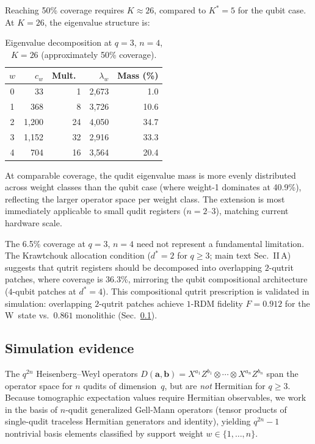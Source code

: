 \documentclass[twocolumn,prx,aps,superscriptaddress,longbibliography]{revtex4-2}
\begin{document}
Reaching 50\% coverage requires $K \approx 26$, compared to
$K^* = 5$ for the qubit case.  At $K = 26$, the eigenvalue
structure is:

\begin{table}[ht!]
\caption{Eigenvalue decomposition at $q = 3$, $n = 4$, $K = 26$
(approximately 50\% coverage).}
\label{tab:q3-k26}
\begin{ruledtabular}
\begin{tabular}{crrrr}
$w$ & $c_w$ & Mult.\ & $\lambda_w$ & Mass (\%) \\
\hline
0 & 33  & 1  & 2{,}673 & 1.0 \\
1 & 368 & 8  & 3{,}726 & 10.6 \\
2 & 1{,}200 & 24 & 4{,}050 & 34.7 \\
3 & 1{,}152 & 32 & 2{,}916 & 33.3 \\
4 & 704 & 16 & 3{,}564 & 20.4 \\
\end{tabular}
\end{ruledtabular}
\end{table}

At comparable coverage, the qudit eigenvalue mass is more evenly
distributed across weight classes than the qubit case (where
weight-1 dominates at 40.9\%), reflecting the larger operator space
per weight class.  The extension is most immediately applicable to
small qudit registers ($n = 2$--$3$), matching current hardware
scale.

The 6.5\% coverage at $q = 3$, $n = 4$ need not represent a
fundamental limitation.  The Krawtchouk allocation condition ($d^* = 2$ for
$q \geq 3$; main text Sec.~II\,A) suggests that qutrit registers
should be decomposed into overlapping $2$-qutrit patches, where
coverage is $36.3$\%, mirroring the qubit compositional
architecture ($4$-qubit patches at $d^* = 4$).  This
compositional qutrit prescription is validated in simulation:
overlapping $2$-qutrit patches achieve $1$-RDM fidelity
$F = 0.912$ for the W~state vs.\ $0.861$ monolithic
(Sec.~\ref{sec:qudit-sim}).

\subsection{Simulation evidence}
\label{sec:qudit-sim}

The $q^{2n}$ Heisenberg--Weyl operators
$D(\mathbf{a}, \mathbf{b}) =
X^{a_1} Z^{b_1} \otimes \cdots \otimes X^{a_n} Z^{b_n}$
span the operator space for $n$ qudits of dimension~$q$, but are
\emph{not} Hermitian for $q \geq 3$.  Because tomographic
expectation values require Hermitian observables, we work in the
basis of $n$-qudit generalized Gell-Mann operators (tensor products
of single-qudit traceless Hermitian generators and identity),
yielding $q^{2n} - 1$ nontrivial basis elements classified by
support weight $w \in \{1, \ldots, n\}$.
\end{document}
